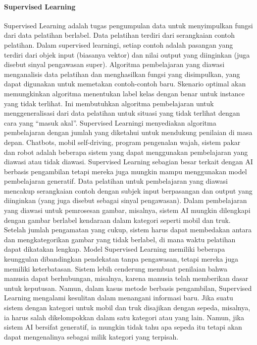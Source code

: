 \paragraph{Supervised Learning}\hspace{0pt}  \par
Supervised Learning adalah tugas pengumpulan data untuk menyimpulkan fungsi dari data pelatihan berlabel. Data pelatihan terdiri dari serangkaian contoh pelatihan. Dalam supervised learningi, setiap contoh adalah pasangan yang terdiri dari objek input (biasanya vektor) dan nilai output yang diinginkan (juga disebut sinyal pengawasan super). Algoritma pembelajaran yang diawasi menganalisis data pelatihan dan menghasilkan fungsi yang disimpulkan, yang dapat digunakan untuk memetakan contoh-contoh baru. Skenario optimal akan memungkinkan algoritma menentukan label kelas dengan benar untuk instance yang tidak terlihat. Ini membutuhkan algoritma pembelajaran untuk menggeneralisasi dari data pelatihan untuk situasi yang tidak terlihat dengan cara yang “masuk akal”.
Supervised Learningi menyediakan algoritma pembelajaran dengan jumlah yang diketahui untuk mendukung penilaian di masa depan. Chatbots, mobil self-driving, program pengenalan wajah, sistem pakar dan robot adalah beberapa sistem yang dapat menggunakan pembelajaran yang diawasi atau tidak diawasi. Supervised Learning sebagian besar terkait dengan AI berbasis pengambilan tetapi mereka juga mungkin mampu menggunakan model pembelajaran generatif.
Data pelatihan untuk pembelajaran yang diawasi mencakup serangkaian contoh dengan subjek input berpasangan dan output yang diinginkan (yang juga disebut sebagai sinyal pengawasan). Dalam pembelajaran yang diawasi untuk pemrosesan gambar, misalnya, sistem AI mungkin dilengkapi dengan gambar berlabel kendaraan dalam kategori seperti mobil dan truk. Setelah jumlah pengamatan yang cukup, sistem harus dapat membedakan antara dan mengkategorikan gambar yang tidak berlabel, di mana waktu pelatihan dapat dikatakan lengkap.
Model Supervised Learning memiliki beberapa keunggulan dibandingkan pendekatan tanpa pengawasan, tetapi mereka juga memiliki keterbatasan. Sistem lebih cenderung membuat penilaian bahwa manusia dapat berhubungan, misalnya, karena manusia telah memberikan dasar untuk keputusan. Namun, dalam kasus metode berbasis pengambilan, Supervised Learning mengalami kesulitan dalam menangani informasi baru. Jika suatu sistem dengan kategori untuk mobil dan truk disajikan dengan sepeda, misalnya, ia harus salah dikelompokkan dalam satu kategori atau yang lain. Namun, jika sistem AI bersifat generatif, ia mungkin tidak tahu apa sepeda itu tetapi akan dapat mengenalinya sebagai milik kategori yang terpisah.

